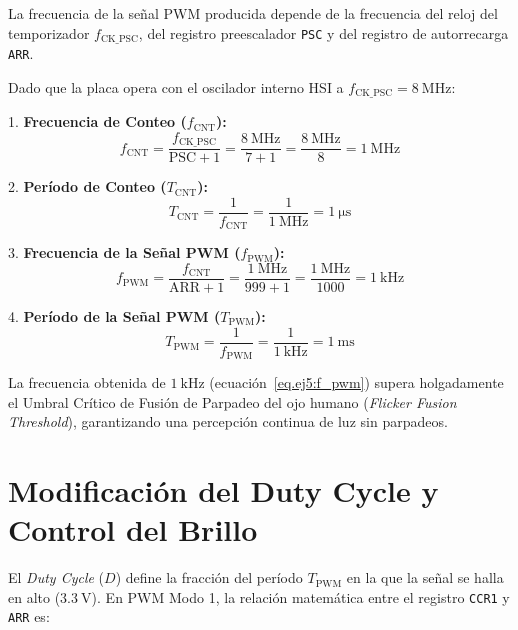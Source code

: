 La frecuencia de la señal PWM producida depende de la frecuencia del reloj del temporizador $f_{\mathrm{CK\_PSC}}$, del
registro preescalador \texttt{PSC} y del registro de autorrecarga \texttt{ARR}.

Dado que la placa opera con el oscilador interno HSI a $f_{\mathrm{CK\_PSC}} = \qty{8}{\MHz}$:

1. \textbf{Frecuencia de Conteo ($f_{\mathrm{CNT}}$):}
\begin{equation}
    f_{\mathrm{CNT}} = \frac{f_{\mathrm{CK\_PSC}}}{\text{PSC} + 1} = \frac{\qty{8}{\MHz}}{7 + 1} = \frac{\qty{8}{\MHz}}{8} = \qty{1}{\MHz}
    \label{eq.ej5:f_cnt}
\end{equation}

2. \textbf{Período de Conteo ($T_{\mathrm{CNT}}$):}
\begin{equation}
    T_{\mathrm{CNT}} = \frac{1}{f_{\mathrm{CNT}}} = \frac{1}{\qty{1}{\MHz}} = \qty{1}{\us}
    \label{eq.ej5:t_cnt}
\end{equation}

3. \textbf{Frecuencia de la Señal PWM ($f_{\mathrm{PWM}}$):}
\begin{equation}
    f_{\mathrm{PWM}} = \frac{f_{\mathrm{CNT}}}{\text{ARR} + 1} = \frac{\qty{1}{\MHz}}{999 + 1} = \frac{\qty{1}{\MHz}}{1000} = \qty{1}{\kHz}
    \label{eq.ej5:f_pwm}
\end{equation}

4. \textbf{Período de la Señal PWM ($T_{\mathrm{PWM}}$):}
\begin{equation}
    T_{\mathrm{PWM}} = \frac{1}{f_{\mathrm{PWM}}} = \frac{1}{\qty{1}{\kHz}} = \qty{1}{\ms}
    \label{eq.ej5:t_pwm}
\end{equation}

La frecuencia obtenida de $\qty{1}{\kHz}$ (ecuación~\ref{eq.ej5:f_pwm}) supera holgadamente el Umbral Crítico de Fusión de
Parpadeo del ojo humano (\textit{Flicker Fusion Threshold}), garantizando una percepción continua de luz sin parpadeos.

\section{Modificación del Duty Cycle y Control del Brillo}
\label{sec.ej5:duty_cycle}

El \textit{Duty Cycle} ($D$) define la fracción del período $T_{\mathrm{PWM}}$ en la que la señal se halla en alto ($\qty{3.3}{\V}$).
En PWM Modo 1, la relación matemática entre el registro \texttt{CCR1} y \texttt{ARR} es:

